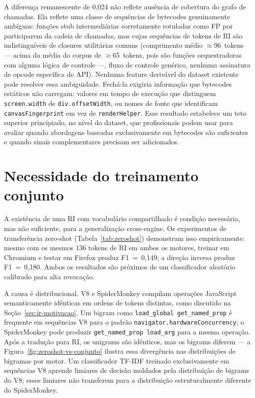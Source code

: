 A diferença remanescente de 0,024 não reflete ausência de cobertura do grafo de
chamadas. Ela reflete uma classe de sequências de bytecodes genuinamente ambíguas:
funções stub intermediárias corretamente rotuladas como FP por participarem da cadeia
de chamadas, mas cujas sequências de tokens de RI são indistinguíveis de
closures utilitárias comuns (comprimento médio $\approx$96~tokens — acima da
média do corpus de $\approx$65~tokens, pois são funções orquestradoras com
alguma lógica de controle —, fluxo de controle genérico, nenhuma assinatura de opcode específica de API). Nenhuma feature
derivável do dataset existente pode resolver essa ambiguidade. Fechá-la exigiria
informação que bytecodes estáticos não carregam: valores em tempo de execução que
distinguem \texttt{screen.width} de \texttt{div.offsetWidth}, ou nomes de fonte que
identificam \texttt{canvasFingerprint} em vez de \texttt{renderHelper}. Esse
resultado estabelece um teto superior principiado, no nível do dataset, que
profissionais podem usar para avaliar quando abordagens baseadas exclusivamente em
bytecodes são suficientes e quando sinais complementares precisam ser adicionados.

\section{Necessidade do treinamento conjunto}
\label{sec:disc-conjunto}

A existência de uma RI com vocabulário compartilhado é condição necessária,
mas não suficiente, para a generalização cross-engine. Os experimentos de
transferência zero-shot (Tabela~\ref{tab:zeroshot}) demonstram isso empiricamente:
mesmo com os mesmos 136 tokens de RI em ambos os motores, treinar em Chromium e
testar em Firefox produz F1~=~0,149; a direção inversa produz F1~=~0,180. Ambos os
resultados são próximos de um classificador aleatório calibrado para alta
revocação.

A causa é distribucional. V8 e SpiderMonkey compilam operações JavaScript
semanticamente idênticas em ordens de tokens distintas, como discutido na
Seção~\ref{sec:ir-motivacao}. Um bigram como \texttt{load\_global get\_named\_prop}
é frequente em sequências V8 para o padrão \texttt{navigator.hardwareConcurrency};
o SpiderMonkey pode produzir \texttt{get\_named\_prop load\_arg} para a mesma
operação. Após a tradução para RI, os unigrams são idênticos, mas os
bigrams diferem — a Figura~\ref{fig:zeroshot-vs-conjunto} ilustra essa
divergência nas distribuições de bigramas por motor. Um classificador TF-IDF
treinado exclusivamente em sequências V8 aprende limiares de decisão moldados
pela distribuição de bigrams do V8; esses limiares não transferem para a
distribuição estruturalmente diferente do SpiderMonkey.

